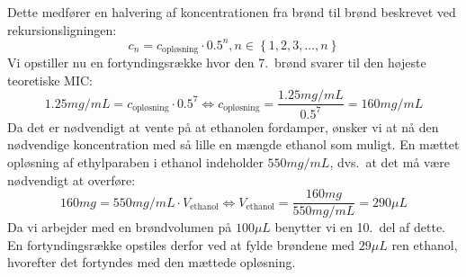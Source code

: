     Dette medfører en halvering af koncentrationen fra brønd til brønd beskrevet ved rekursionsligningen:
    \[
        c_n=c_{\text{opløsning}}\cdot 0.5^n, n \in \left\{1,2,3,...,n\right\}
    \]
    Vi opstiller nu en fortyndingsrække hvor den 7.\ brønd svarer til den højeste teoretiske MIC:
    \[
        1.25\si{mg\per mL}=c_{\text{opløsning}}\cdot 0.5^7 \Leftrightarrow c_{\text{opløsning}}=\frac{1.25\si{mg\per mL}}{0.5^7}=160\si{mg\per mL}
    \]
    Da det er nødvendigt at vente på at ethanolen fordamper, ønsker vi at nå den nødvendige koncentration med så lille en mængde ethanol som muligt. En mættet opløsning af ethylparaben i ethanol indeholder $550\si{mg\per mL}$, dvs.\ at det må være nødvendigt at overføre:
    \[
        160\si{mg}=550\si{mg\per mL} \cdot V_{\text{ethanol}} \Leftrightarrow V_{\text{ethanol}}=\frac{160\si{mg}}{550\si{mg\per mL}}=290\si{\mu L}
    \]
    Da vi arbejder med en brøndvolumen på $100\si{\mu L}$ benytter vi en 10.\ del af dette. En fortyndingsrække opstiles derfor ved at fylde brøndene med $29\si{\mu L}$ ren ethanol, hvorefter det fortyndes med den mættede opløsning.

